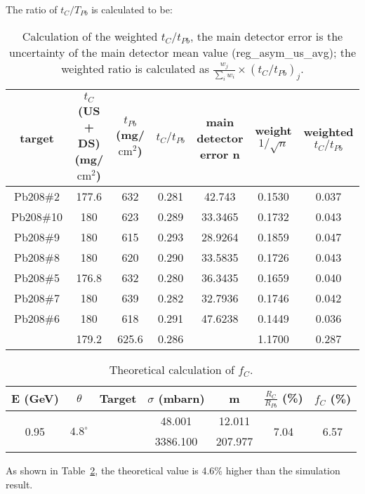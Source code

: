 The ratio of $t_C/T_{Pb}$ is calculated to be:
\begin{table}[!h]
    \centering
    \begin{tabular}{c | c c c | c c c}
	\hline
	target	& \makecell{$t_C$ (US + DS) \\ (mg/$\mathrm{cm}^2$)} & \makecell{$t_{Pb}$ \\ (mg/$\mathrm{cm}^2$)}	
	& $t_C/t_{Pb}$  & \makecell{main detector \\ error n} & \makecell{weight \\ $1/\sqrt{n}$}    & \makecell{weighted \\ $t_C/t_{Pb}$} \\
	\hline
	Pb208\#2    & 177.6	& 632	& 0.281	& 42.743    & 0.1530	& 0.037 \\
	Pb208\#10   & 180	& 623	& 0.289	& 33.3465   & 0.1732	& 0.043	\\
	Pb208\#9    & 180	& 615   & 0.293 & 28.9264   & 0.1859   	& 0.047	\\
	Pb208\#8    & 180	& 620   & 0.290 & 33.5835   & 0.1726   	& 0.043	\\
	Pb208\#5    & 176.8	& 632   & 0.280 & 36.3435   & 0.1659   	& 0.040	\\
	Pb208\#7    & 180	& 639   & 0.282 & 32.7936   & 0.1746   	& 0.042	\\
	Pb208\#6    & 180	& 618   & 0.291 & 47.6238   & 0.1449   	& 0.036	\\
	\hline
		    & 179.2	& 625.6	& 0.286	&	    & 1.1700	& \color{red} 0.287 \\
	\hline                                                
    \end{tabular}
    \caption{Calculation of the weighted $t_C/t_{Pb}$, the main detector error is
    the uncertainty of the main detector mean value (reg\_asym\_us\_avg); the 
    weighted ratio is calculated as $\frac{w_j}{\sum_i w_i} \times \left( t_C/t_{Pb} \right)_j$.}
    \label{tab:ratio_of_area_density}
\end{table}

\begin{table}[!h]
    \centering
    \begin{tabular}{c c | c c c | c c}
	\hline
	E (GeV)   & $\theta$  & Target    & $\sigma$ (mbarn)    & m & $\frac{R_C}{R_{Pb}}$ (\%) & $f_C$ (\%)    \\
	\hline
	\multirow{2}{*}{0.95}	& \multirow{2}{*}{$4.8^\circ$}	& 
	      \C    & 48.001	& 12.011    & \multirow{2}{*}{7.04} & \multirow{2}{*}{6.57} \\
	\cline{3-5}
	&   & \Pb   & 3386.100	& 207.977   &	& \\
	\hline
    \end{tabular}
    \caption{Theoretical calculation of $f_C$. 
    }
    \label{tab:theoretical_value}
\end{table}
As shown in Table~\ref{tab:theoretical_value}, the theoretical value is 4.6\% higher than the simulation result.

